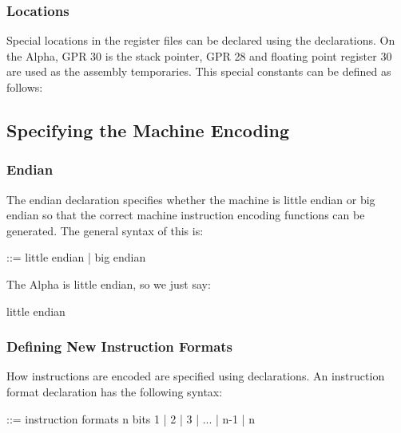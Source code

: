 \subsubsection{Locations}

  Special locations in the register files can be declared using the
 declarations.  On the Alpha, GPR
30 is the stack pointer, GPR 28 and floating point register 30
are used as the assembly temporaries.  This special constants
can be defined as follows:


\subsection{Specifying the Machine Encoding}
\subsubsection{Endian}

The endian declaration specifies whether the machine is little
endian or big endian so that the correct machine instruction encoding 
functions can be generated.  The general syntax of this is:

\begin{SML}
    ::= little endian | big endian
\end{SML}

The Alpha is little endian, so we just say: 
\begin{SML}
    little endian
\end{SML}

\subsubsection{Defining New Instruction Formats}

   How instructions are encoded are specified using 
 declarations.  An instruction format declaration
has the following syntax:
\begin{SML}
   ::=
     instruction formats n bits 
       1
     | 2
     | 3
     | ...
     | n-1
     | n
\end{SML}

